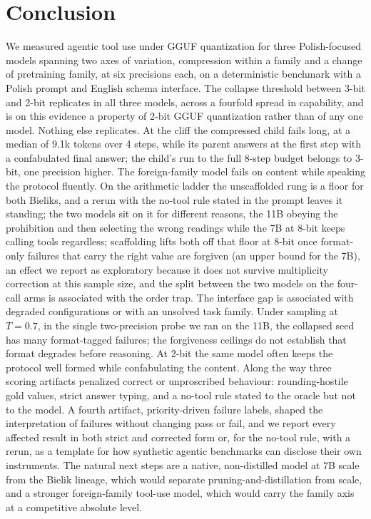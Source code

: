 \documentclass[11pt]{article}
\begin{document}
\section{Conclusion}
We measured agentic tool use under GGUF quantization for three Polish-focused models spanning two axes of variation, compression within a family and a change of pretraining family, at six precisions each, on a deterministic benchmark with a Polish prompt and English schema interface. The collapse threshold between 3-bit and 2-bit replicates in all three models, across a fourfold spread in capability, and is on this evidence a property of 2-bit GGUF quantization rather than of any one model. Nothing else replicates. At the cliff the compressed child fails long, at a median of 9.1k tokens over 4 steps, while its parent answers at the first step with a confabulated final answer; the child's run to the full 8-step budget belongs to 3-bit, one precision higher. The foreign-family model fails on content while speaking the protocol fluently. On the arithmetic ladder the unscaffolded rung is a floor for both Bieliks, and a rerun with the no-tool rule stated in the prompt leaves it standing; the two models sit on it for different reasons, the 11B obeying the prohibition and then selecting the wrong readings while the 7B at 8-bit keeps calling tools regardless; scaffolding lifts both off that floor at 8-bit once format-only failures that carry the right value are forgiven (an upper bound for the 7B), an effect we report as exploratory because it does not survive multiplicity correction at this sample size, and the split between the two models on the four-call arms is associated with the order trap. The interface gap is associated with degraded configurations or with an unsolved task family. Under sampling at $T=0.7$, in the single two-precision probe we ran on the 11B, the collapsed seed has many format-tagged failures; the forgiveness ceilings do not establish that format degrades before reasoning. At 2-bit the same model often keeps the protocol well formed while confabulating the content. Along the way three scoring artifacts penalized correct or unproscribed behaviour: rounding-hostile gold values, strict answer typing, and a no-tool rule stated to the oracle but not to the model. A fourth artifact, priority-driven failure labels, shaped the interpretation of failures without changing pass or fail, and we report every affected result in both strict and corrected form or, for the no-tool rule, with a rerun, as a template for how synthetic agentic benchmarks can disclose their own instruments. The natural next steps are a native, non-distilled model at 7B scale from the Bielik lineage, which would separate pruning-and-distillation from scale, and a stronger foreign-family tool-use model, which would carry the family axis at a competitive absolute level.
\end{document}
